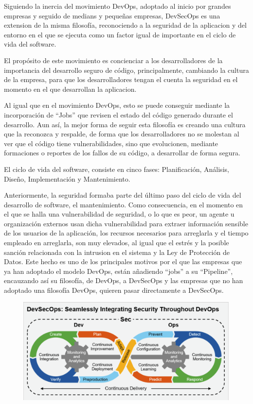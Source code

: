 \documentclass[12pt]{report} %
\begin{document}
Siguiendo la inercia del movimiento DevOps, adoptado al inicio por grandes empresas y seguido de medians y pequeñas empresas, DevSecOps es una extension de la misma filosofía, reconociendo a la seguridad de la aplicacion y del entorno en el que se ejecuta como un factor igual de importante en el ciclo de vida del software.

El propósito de este movimiento es concienciar a los desarrolladores de la importancia del desarrollo seguro de código, principalmente, cambiando la cultura de la empresa, para que los desarrolladores tengan el cuenta la seguridad en el momento en el que desarrollan la aplicacion.

Al igual que en el movimiento DevOps, esto se puede conseguir mediante la incorporación de ``Jobs'' que revisen el estado del código generado durante el desarrollo.
Aun así, la mejor forma de seguir esta filosofía es creando una cultura que la reconozca y respalde, de forma que los desarrolladores no se molestan al ver que el código tiene vulnerabilidades, sino que evolucionen, mediante formaciones o reportes de los fallos de su código, a desarrollar de forma segura.

El ciclo de vida del software, consiste en cinco fases: Planificación, Análisis, Diseño, Implementación y Mantenimiento.


Anteriormente, la seguridad formaba parte del último paso del ciclo de vida del desarrollo de software, el mantenimiento.
Como consecuencia, en el momento en el que se halla una vulnerabilidad de seguridad, o lo que es peor, un agente u organización externos usan dicha vulnerabilidad para extraer información sensible de los usuarios de la aplicación, los recursos necesarios para arreglarla y el tiempo empleado en arreglarla, son muy elevados, al igual que el estrés y la posible sanción relacionada con la intrusion en el sistema y la Ley de Protección de Datos.
Este hecho es uno de los principales motivos por el que las empresas que ya han adoptado el modelo DevOps, están añadiendo ``jobs'' a su ``Pipeline'', encauzando así su filosofía, de DevOps, a DevSecOps y las empresas que no han adoptado una filosofía DevOps, quieren pasar directamente a DevSecOps.

\begin{figure}
  \includegraphics[width=\textwidth]{devsecops.png}
\end{figure}
\end{document}
